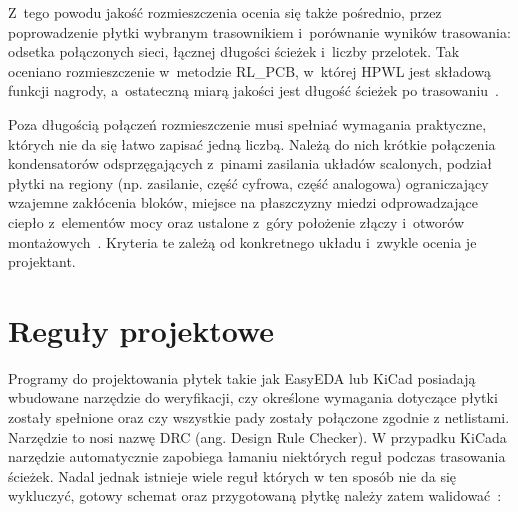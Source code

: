 Z~tego powodu jakość rozmieszczenia ocenia się także pośrednio, przez
poprowadzenie płytki wybranym trasownikiem i~porównanie wyników trasowania:
odsetka połączonych sieci, łącznej długości ścieżek i~liczby przelotek. Tak
oceniano rozmieszczenie w~metodzie RL\_PCB, w~której HPWL jest składową
funkcji nagrody, a~ostateczną miarą jakości jest długość ścieżek po
trasowaniu~\cite{Vassallo2024RLPCB}.

Poza długością połączeń rozmieszczenie musi spełniać wymagania praktyczne,
których nie da się łatwo zapisać jedną liczbą. Należą do nich krótkie
połączenia kondensatorów odsprzęgających z~pinami zasilania układów
scalonych, podział płytki na regiony (np. zasilanie, część cyfrowa, część
analogowa) ograniczający wzajemne zakłócenia bloków, miejsce na płaszczyzny
miedzi odprowadzające ciepło z~elementów mocy oraz ustalone z~góry położenie
złączy i~otworów montażowych~\cite{Gora_ProjektowaniePCB}.
Kryteria te zależą od konkretnego układu i~zwykle ocenia je projektant.

\section{Reguły projektowe}

Programy do projektowania płytek takie jak EasyEDA lub KiCad posiadają wbudowane narzędzie do weryfikacji,
czy określone wymagania dotyczące płytki zostały spełnione oraz czy wszystkie pady zostały połączone zgodnie z
netlistami. Narzędzie to nosi nazwę DRC (ang. Design Rule Checker). W przypadku KiCada narzędzie automatycznie
zapobiega łamaniu niektórych reguł podczas trasowania ścieżek. Nadal jednak istnieje wiele reguł których w ten
sposób nie da się wykluczyć, gotowy schemat oraz przygotowaną płytkę należy zatem walidować~\cite{KiCad_PCBEditor_DRC}:

